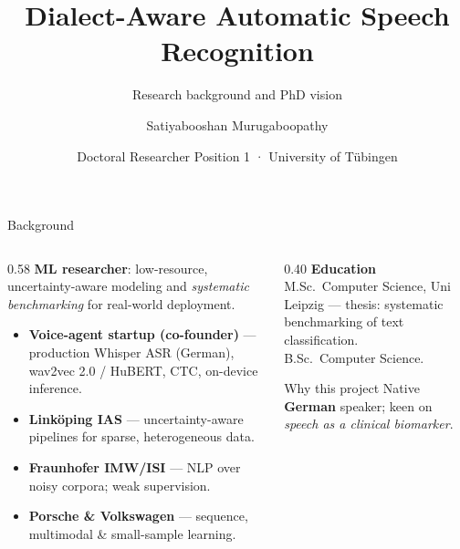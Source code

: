 \documentclass[10pt]{beamer}
\title[Dialect-Aware ASR]{Dialect-Aware Automatic Speech Recognition}
\subtitle{Research background and PhD vision}
\author[S. Murugaboopathy]{Satiyabooshan Murugaboopathy}
\date{Doctoral Researcher Position 1 · University of Tübingen}
\begin{document}
\begin{frame}
  \maketitle
\end{frame}

\begin{frame}{Background}
  \begin{columns}[T]
    \begin{column}{0.58\textwidth}
      \small
      \textbf{ML researcher}: low-resource, uncertainty-aware modeling and
      \emph{systematic benchmarking} for real-world deployment.
      \vspace{0.4em}
      \begin{itemize}
        \item \textbf{Voice-agent startup (co-founder)} — production Whisper ASR
              (German), wav2vec 2.0 / HuBERT, CTC, on-device inference.
        \item \textbf{Linköping IAS} — uncertainty-aware pipelines for sparse,
              heterogeneous data.
        \item \textbf{Fraunhofer IMW/ISI} — NLP over noisy corpora; weak supervision.
        \item \textbf{Porsche \& Volkswagen} — sequence, multimodal \& small-sample learning.
      \end{itemize}
    \end{column}
    \begin{column}{0.40\textwidth}
      \small
      \textbf{Education}\\
      M.Sc.\ Computer Science, Uni Leipzig — thesis: systematic benchmarking of
      text classification.\\[0.2em]
      B.Sc.\ Computer Science.
      \vspace{0.5em}
      \begin{alertblock}{Why this project}
        Native \textbf{German} speaker; keen on \emph{speech as a clinical biomarker}.
      \end{alertblock}
    \end{column}
  \end{columns}
\end{frame}
\end{document}
